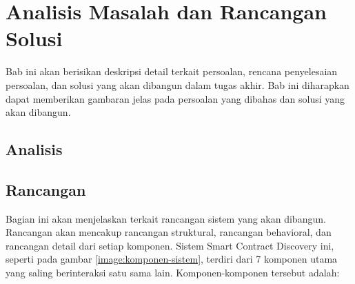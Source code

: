 \chapter{Analisis Masalah dan Rancangan Solusi}

Bab ini akan berisikan deskripsi detail terkait persoalan, rencana penyelesaian persoalan, dan solusi yang akan dibangun dalam tugas akhir. Bab ini diharapkan dapat memberikan gambaran jelas pada persoalan yang dibahas dan solusi yang akan dibangun.


\section{Analisis}







\break

\section{Rancangan}

Bagian ini akan menjelaskan terkait rancangan sistem yang akan dibangun. Rancangan akan mencakup rancangan struktural, rancangan behavioral, dan rancangan detail dari setiap komponen. Sistem Smart Contract Discovery ini, seperti pada gambar \ref{image:komponen-sistem}, terdiri dari 7 komponen utama yang saling berinteraksi satu sama lain. Komponen-komponen tersebut adalah:

